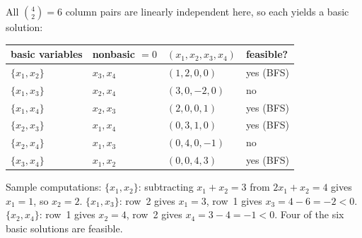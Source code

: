 \begin{solutions}
  \item All $\binom{4}{2}=6$ column pairs are linearly independent here,
        so each yields a basic solution:
        \begin{center}
        \begin{tabular}{llll}
          \hline
          basic variables & nonbasic $=0$ &
          $(x_{1},x_{2},x_{3},x_{4})$ & feasible?\\
          \hline
          $\{x_{1},x_{2}\}$ & $x_{3},x_{4}$ & $(1,2,0,0)$ & yes (BFS)\\
          $\{x_{1},x_{3}\}$ & $x_{2},x_{4}$ & $(3,0,-2,0)$ & no\\
          $\{x_{1},x_{4}\}$ & $x_{2},x_{3}$ & $(2,0,0,1)$ & yes (BFS)\\
          $\{x_{2},x_{3}\}$ & $x_{1},x_{4}$ & $(0,3,1,0)$ & yes (BFS)\\
          $\{x_{2},x_{4}\}$ & $x_{1},x_{3}$ & $(0,4,0,-1)$ & no\\
          $\{x_{3},x_{4}\}$ & $x_{1},x_{2}$ & $(0,0,4,3)$ & yes (BFS)\\
          \hline
        \end{tabular}
        \end{center}
        Sample computations: $\{x_{1},x_{2}\}$: subtracting
        $x_{1}+x_{2}=3$ from $2x_{1}+x_{2}=4$ gives $x_{1}=1$, so
        $x_{2}=2$. $\{x_{1},x_{3}\}$: row~2 gives $x_{1}=3$, row~1 gives
        $x_{3}=4-6=-2<0$. $\{x_{2},x_{4}\}$: row~1 gives $x_{2}=4$,
        row~2 gives $x_{4}=3-4=-1<0$. Four of the six basic solutions are
        feasible.


\end{solutions}
